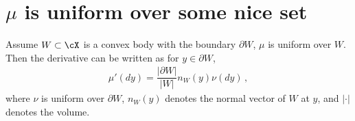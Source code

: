 \documentclass[11pt,letterpaper,english]{article}
\begin{document}
\section{$\mu$ is uniform over some nice set}
Assume $W\subset \cX$ is a convex body with the boundary $\partial W$, $\mu$ is uniform over $W$. Then the derivative can be written as for $y\in \partial W$,
\begin{align*}
\mu'(dy) = \dfrac{\vert \partial W \vert}{\vert W \vert}n_W(y) \nu(dy) \,,
\end{align*}
where $\nu$ is uniform over $\partial W$, $n_W(y)$ denotes the normal vector of $W$ at $y$, and $\vert \cdot\vert$ denotes the volume.
\end{document}
